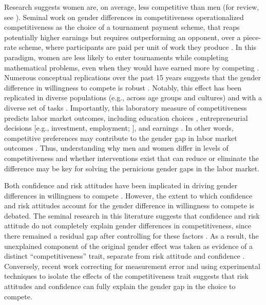 \documentclass[a4paper, nobind]{templates/ociamthesis}
\begin{document}
Research suggests women are, on average, less competitive than men (for review, see \textcite{Niederle2011}). Seminal work on gender differences in competitiveness operationalized competitiveness as the choice of a tournament payment scheme, that reaps potentially higher earnings but requires outperforming an opponent, over a piece-rate scheme, where participants are paid per unit of work they produce \autocite{Niederle2007}. In this paradigm, women are less likely to enter tournaments while completing mathematical problems, even when they would have earned more by competing \autocite{Niederle2007}. Numerous conceptual replications over the past 15 years suggests that the gender difference in willingness to compete is robust \autocites[see][ for review]{Niederle2011,Niederle2017a,Niederle2017b}. Notably, this effect has been replicated in diverse populations (e.g., across age groups and cultures) \autocite{Apicella2015,Buser2014,Sutter2016,Andersen2013,Buser2017b,Sutter2010,Dreber2014,Mayr2012} and with a diverse set of tasks \autocite{Apicella2015,Saccardo2018,Bjorvatn2016,Sutter2015,Frick2011,Samek2019}. Importantly, this laboratory measure of competitiveness predicts labor market outcomes, including education choices \autocite{Buser2014,Zhang2012}, entrepreneurial decisions {[}e.g., investment, employment; \textcite{Berge2015}{]}, and earnings \autocite{Reuben2015}. In other words, competitive preferences may contribute to the gender gap in labor market outcomes \autocite{Blau2017}. Thus, understanding why men and women differ in levels of competitiveness and whether interventions exist that can reduce or eliminate the difference may be key for solving the pernicious gender gaps in the labor market.

Both confidence and risk attitudes have been implicated in driving gender differences in willingness to compete \autocite{Niederle2011,Veldhuizen2017}. However, the extent to which confidence and risk attitudes account for the gender difference in willingness to compete is debated. The seminal research in this literature suggests that confidence and risk attitude do not completely explain gender differences in competitiveness, since there remained a residual gap after controlling for these factors \autocite{Niederle2007}. As a result, the unexplained component of the original gender effect was taken as evidence of a distinct ``competitiveness'' trait, separate from risk attitude and confidence \autocite{Niederle2007,Niederle2011}. Conversely, recent work correcting for measurement error \autocite{Gillen2019} and using experimental techniques to isolate the effects of the competitiveness trait \autocite{Veldhuizen2017} suggests that risk attitudes and confidence can fully explain the gender gap in the choice to compete.
\end{document}
